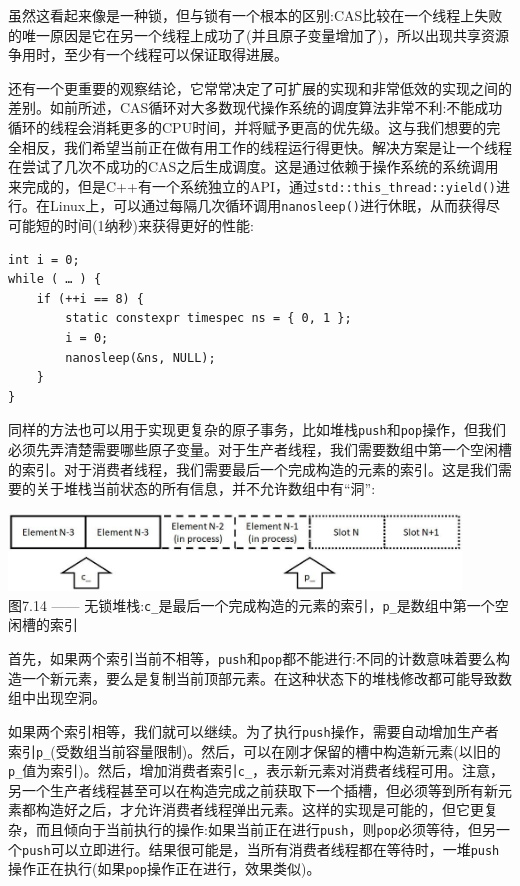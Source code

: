 虽然这看起来像是一种锁，但与锁有一个根本的区别:CAS比较在一个线程上失败的唯一原因是它在另一个线程上成功了(并且原子变量增加了)，所以出现共享资源争用时，至少有一个线程可以保证取得进展。

还有一个更重要的观察结论，它常常决定了可扩展的实现和非常低效的实现之间的差别。如前所述，CAS循环对大多数现代操作系统的调度算法非常不利:不能成功循环的线程会消耗更多的CPU时间，并将赋予更高的优先级。这与我们想要的完全相反，我们希望当前正在做有用工作的线程运行得更快。解决方案是让一个线程在尝试了几次不成功的CAS之后生成调度。这是通过依赖于操作系统的系统调用来完成的，但是C++有一个系统独立的API，通过\texttt{std::this\_thread::yield()}进行。在Linux上，可以通过每隔几次循环调用\texttt{nanosleep()}进行休眠，从而获得尽可能短的时间(1纳秒)来获得更好的性能:

\begin{lstlisting}[style=styleCXX]
int i = 0;
while ( … ) {
	if (++i == 8) {
		static constexpr timespec ns = { 0, 1 };
		i = 0;
		nanosleep(&ns, NULL);
	}
}
\end{lstlisting}

同样的方法也可以用于实现更复杂的原子事务，比如堆栈\texttt{push}和\texttt{pop}操作，但我们必须先弄清楚需要哪些原子变量。对于生产者线程，我们需要数组中第一个空闲槽的索引。对于消费者线程，我们需要最后一个完成构造的元素的索引。这是我们需要的关于堆栈当前状态的所有信息，并不允许数组中有“洞”:

\begin{center}
\includegraphics[width=0.9\textwidth]{content/2/chapter7/images/14.jpg}\\ 
图7.14 —— 无锁堆栈:\texttt{c\_}是最后一个完成构造的元素的索引，\texttt{p\_}是数组中第一个空闲槽的索引
\end{center}

首先，如果两个索引当前不相等，\texttt{push}和\texttt{pop}都不能进行:不同的计数意味着要么构造一个新元素，要么是复制当前顶部元素。在这种状态下的堆栈修改都可能导致数组中出现空洞。

如果两个索引相等，我们就可以继续。为了执行\texttt{push}操作，需要自动增加生产者索引\texttt{p\_}(受数组当前容量限制)。然后，可以在刚才保留的槽中构造新元素(以旧的\texttt{p\_}值为索引)。然后，增加消费者索引\texttt{c\_}，表示新元素对消费者线程可用。注意，另一个生产者线程甚至可以在构造完成之前获取下一个插槽，但必须等到所有新元素都构造好之后，才允许消费者线程弹出元素。这样的实现是可能的，但它更复杂，而且倾向于当前执行的操作:如果当前正在进行\texttt{push}，则\texttt{pop}必须等待，但另一个\texttt{push}可以立即进行。结果很可能是，当所有消费者线程都在等待时，一堆\texttt{push}操作正在执行(如果\texttt{pop}操作正在进行，效果类似)。

